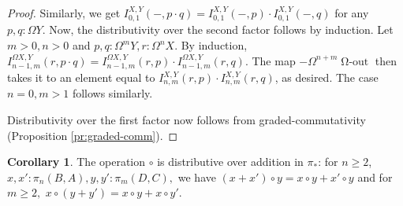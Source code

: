\documentclass{amsart}
\theoremstyle{definition}
\newtheorem{cor}[theorem]{Corollary}
\newcommand{\oout}{\operatorname{\Omega-out}}
\begin{document}
\begin{proof}
    Similarly, we get $I_{0,1}^{X,Y}(-,p \cdot q) = I_{0,1}^{X,Y}(-,p) \cdot I_{0,1}^{X,Y}(-,q)$ for any $p,q: \Omega Y$.
    Now, the distributivity over the second factor follows by induction.
    Let $m>0, n>0$ and $p,q: \Omega^m Y, r: \Omega^n X$. By induction, $I^{\Omega X,Y}_{n-1,m}(r, p \cdot q) = I^{\Omega X,Y}_{n-1,m}(r, p) \cdot I^{\Omega X,Y}_{n-1,m}(r, q)$. The map $-\Omega^{n+m} \oout$ then takes it to an element equal to $ I^{X,Y}_{n,m}(r,p) \cdot  I^{X,Y}_{n,m}(r, q)$, as desired. The case $n=0, m>1$ follows similarly.

    Distributivity over the first factor now follows from graded-commutativity (Proposition \ref{pr:graded-comm}).
\end{proof}

\begin{cor}\label{cor:distr}
    The operation $\circ$ is distributive over addition in $\pi_*$: for $n \geq 2$, $x, x' : \pi_n(B,A), y, y' : \pi_m(D,C),$ we have $(x+x') \circ y = x \circ y + x' \circ y$ and for $m \geq 2,$ $x \circ (y + y') = x \circ y + x \circ y'$.
\end{cor}
\end{document}
